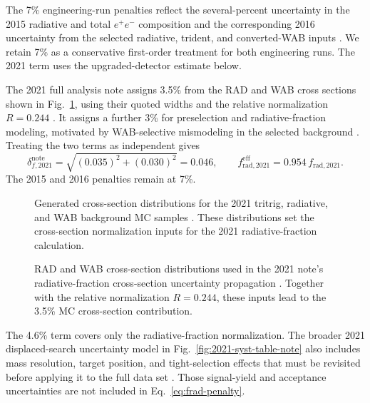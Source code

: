 The 7\% engineering-run penalties reflect the several-percent uncertainty in the 2015
radiative and total $e^+e^-$ composition and the corresponding 2016 uncertainty from
the selected radiative, trident, and converted-WAB inputs
\cite{HPS2015InternalNote,HPS2016PromptLong}. We retain 7\% as a conservative
first-order treatment for both engineering runs. The 2021 term uses the
upgraded-detector estimate below.

The 2021 full analysis note assigns 3.5\% from the RAD and WAB cross sections shown in
Fig.~\ref{fig:2021-radfrac-xsec-note}, using their quoted widths and the relative
normalization $R=0.244$ \cite[Sec.~9.1, Fig.~161]{HPS2021FullAnalysisNote}. It assigns a
further 3\% for preselection and radiative-fraction modeling, motivated by
WAB-selective mismodeling in the selected background
\cite[Sec.~9.2]{HPS2021FullAnalysisNote}. Treating the two terms as independent gives
\begin{equation}
\delta_{f,2021}^{\mathrm{note}}
= \sqrt{(0.035)^2 + (0.030)^2}
= 0.046,
\qquad
f_{\mathrm{rad},2021}^{\mathrm{eff}}
= 0.954\,f_{\mathrm{rad},2021}.
\label{eq:frad-2021-note-penalty}
\end{equation}
The 2015 and 2016 penalties remain at 7\%.

\begin{figure}[H]
\centering
{}
\caption{Generated cross-section distributions for the 2021 tritrig, radiative, and
WAB background MC samples \cite{HPS2021FullAnalysisNote}. These distributions set the
cross-section normalization inputs for the 2021 radiative-fraction calculation.}
\label{fig:2021-radfrac-xsec-note}
\end{figure}

\begin{figure}[H]
\centering
{}
\caption{RAD and WAB cross-section distributions used in the 2021 note's
radiative-fraction cross-section uncertainty propagation \cite{HPS2021FullAnalysisNote}.
Together with the relative normalization $R=0.244$, these inputs lead to the 3.5\%
MC cross-section contribution.}
\label{fig:2021-radfrac-xsec-syst-note}
\end{figure}

The 4.6\% term covers only the radiative-fraction normalization. The broader 2021
displaced-search uncertainty model in Fig.~\ref{fig:2021-syst-table-note} also includes
mass resolution, target position, and tight-selection effects that must be revisited
before applying it to the full data set \cite[Sec.~9,
Table~58]{HPS2021FullAnalysisNote}. Those signal-yield and acceptance uncertainties are
not included in Eq.~\eqref{eq:frad-penalty}.

